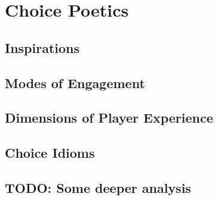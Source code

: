 \chapter{Choice Poetics}

\label{ch:choice-poetics}


\section{Inspirations}


\section{Modes of Engagement}


\section{Dimensions of Player Experience}


\section{Choice Idioms}


\section{TODO: Some deeper analysis}
